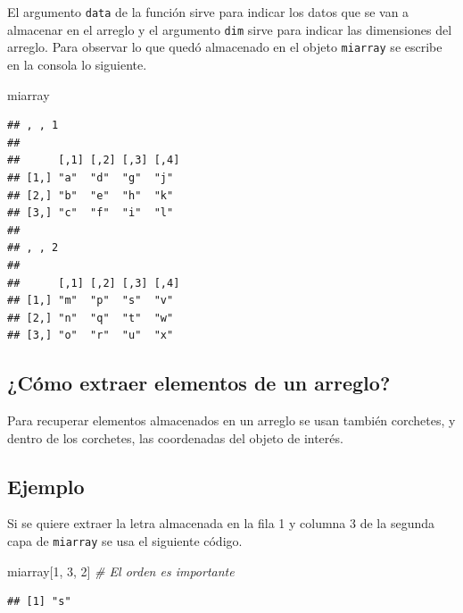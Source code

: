 \documentclass[
]{book}
\newenvironment{Shaded}{\begin{snugshade}}{\end{snugshade}}
\newcommand{\CommentTok}[1]{\textcolor[rgb]{0.56,0.35,0.01}{\textit{#1}}}
\newcommand{\DecValTok}[1]{\textcolor[rgb]{0.00,0.00,0.81}{#1}}
\newcommand{\NormalTok}[1]{#1}
\begin{document}
El argumento \texttt{data} de la función sirve para indicar los datos que se van a almacenar en el arreglo y el argumento \texttt{dim} sirve para indicar las dimensiones del arreglo. Para observar lo que quedó almacenado en el objeto \texttt{miarray} se escribe en la consola lo siguiente.

\begin{Shaded}
\begin{Highlighting}[]
\NormalTok{miarray}
\end{Highlighting}
\end{Shaded}

\begin{verbatim}
## , , 1
## 
##      [,1] [,2] [,3] [,4]
## [1,] "a"  "d"  "g"  "j" 
## [2,] "b"  "e"  "h"  "k" 
## [3,] "c"  "f"  "i"  "l" 
## 
## , , 2
## 
##      [,1] [,2] [,3] [,4]
## [1,] "m"  "p"  "s"  "v" 
## [2,] "n"  "q"  "t"  "w" 
## [3,] "o"  "r"  "u"  "x"
\end{verbatim}

\hypertarget{cuxf3mo-extraer-elementos-de-un-arreglo}{%
\subsection{¿Cómo extraer elementos de un arreglo?}\label{cuxf3mo-extraer-elementos-de-un-arreglo}}

Para recuperar elementos almacenados en un arreglo se usan también corchetes, y dentro de los corchetes, las coordenadas del objeto de interés.

\hypertarget{ejemplo-2}{%
\subsection*{Ejemplo}\label{ejemplo-2}}

Si se quiere extraer la letra almacenada en la fila 1 y columna 3 de la segunda capa de \texttt{miarray} se usa el siguiente código.

\begin{Shaded}
\begin{Highlighting}[]
\NormalTok{miarray[}\DecValTok{1}\NormalTok{, }\DecValTok{3}\NormalTok{, }\DecValTok{2}\NormalTok{]  }\CommentTok{\# El orden es importante}
\end{Highlighting}
\end{Shaded}

\begin{verbatim}
## [1] "s"
\end{verbatim}
\end{document}
